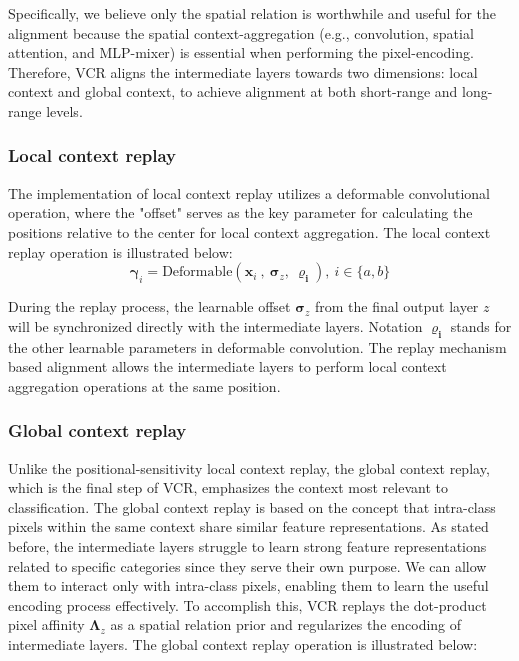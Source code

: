 Specifically, we believe only the spatial relation is worthwhile and useful for the alignment because the spatial context-aggregation (e.g., convolution, spatial attention, and MLP-mixer) is essential when performing the pixel-encoding.
%
Therefore, VCR aligns the intermediate layers towards two dimensions: local context and global context, to achieve alignment at both short-range and long-range levels.

\subsubsection{Local context replay}
The implementation of local context replay utilizes a deformable convolutional operation, where the "offset" serves as the key parameter for calculating the positions relative to the center for local context aggregation.
%
The local context replay operation is illustrated below:
\begin{equation}
    \mathbf{\gamma}_{i} = \text{Deformable}(\mathbf{x}_{i}~,~\mathbf{\sigma}_{z},~\mathbf{\varrho_{i}}),~i \in \{a, b\}
\end{equation}

During the replay process, the learnable offset $\mathbf{\sigma}_{z}$ from the final output layer $z$ will be synchronized directly with the intermediate layers. 
%
Notation $\mathbf{\varrho_{i}}$ stands for the other learnable parameters in deformable convolution.
%
The replay mechanism based alignment allows the intermediate layers to perform local context aggregation operations at the same position.
%


\subsubsection{Global context replay}
Unlike the positional-sensitivity local context replay, the global context replay, which is the final step of VCR, emphasizes the context most relevant to classification. 
%
The global context replay is based on the concept that intra-class pixels within the same context share similar feature representations.
%
As stated before, the intermediate layers struggle to learn strong feature representations related to specific categories since they serve their own purpose.
%
We can allow them to interact only with intra-class pixels, enabling them to learn the useful encoding process effectively.
%
To accomplish this, VCR replays the dot-product pixel affinity $\mathbf{\Lambda}_{z}$ as a spatial relation prior and regularizes the encoding of intermediate layers.
%
The global context replay operation is illustrated below:

